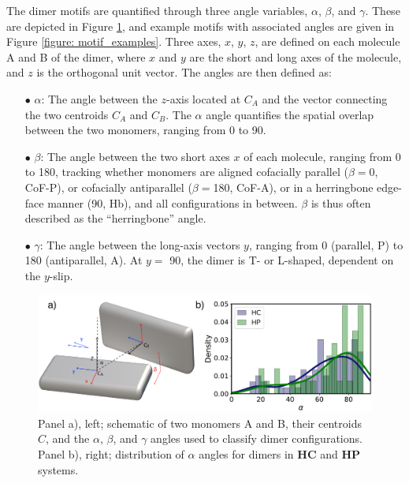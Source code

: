 The dimer motifs are quantified through three angle variables, $\alpha$, $\beta$, and $\gamma$. These are depicted in Figure \ref{figure: dimer_schematic_alpha}, and example motifs with associated angles are given in Figure \ref{figure: motif_examples}. Three axes, $x$, $y$, $z$, are defined on each molecule A and B of the dimer, where $x$ and $y$ are the short and long axes of the molecule, and $z$ is the orthogonal unit vector. The angles are then defined as:
\begin{itemize}
\item[$\bullet$] $\alpha$: The angle between the $z$-axis located at $C_{A}$ and the vector connecting the two centroids $C_{A}$ and $C_{B}$.  The $\alpha$ angle quantifies the spatial overlap between the two monomers, ranging from 0\degree{} to 90\degree{}. 

\item[$\bullet$] $\beta$: The angle between the two short axes $x$ of each molecule, ranging from 0\degree{} to 180\degree{}, tracking whether monomers are aligned cofacially parallel ($\beta=$0\degree{}, CoF-P), or cofacially antiparallel ($\beta=$180\degree{}, CoF-A), or in a herringbone edge-face manner (90\degree{}, Hb), and all configurations in between. $\beta$ is thus often described as the ``herringbone'' angle. 

\item[$\bullet$] $\gamma$: The angle between the long-axis vectors $y$, ranging from 0\degree{} (parallel, P) to 180\degree{} (antiparallel, A). At $y=$ 90\degree{}, the dimer is T- or L-shaped, dependent on the $y$-slip. 
\end{itemize}
\begin{figure}[H]
\centering
  \includegraphics[width=0.8\linewidth]{5ConnectingCrystalStructure/dimer_schematic_alpha}
  \caption[Schematic of $\alpha$, $\beta$, and $\gamma$ angles for classification of dimers.]{Panel a), left; schematic of two monomers A and B, their centroids $C$, and the $\alpha$, $\beta$, and $\gamma$ angles used to classify dimer configurations. Panel b), right; distribution of $\alpha$ angles for dimers in \textbf{HC} and \textbf{HP} systems.}
  \label{figure: dimer_schematic_alpha}
\end{figure}

